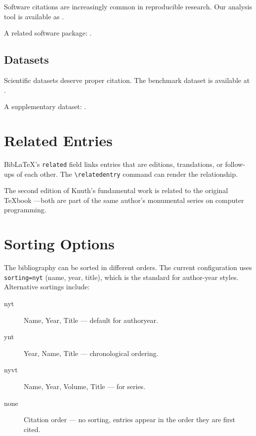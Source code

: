 \documentclass[
    language=english,
    doctype=article,
    institution=none,
]{../../omnilatex}
\begin{document}
Software citations are increasingly common in reproducible research.
Our analysis tool is available as \cite{omnilatex2026}.

A related software package: \cite{biber2024}.

\subsection{Datasets}

Scientific datasets deserve proper citation.  The benchmark dataset is
available at \cite{kaggleGraphBenchmark2025}.

A supplementary dataset: \cite{openalexCitationGraph2025}.

\section{Related Entries}
\label{sec:related}

BibLaTeX's \texttt{related} field links entries that are editions,
translations, or follow-ups of each other.  The \verb|\relatedentry|
command can render the relationship.

The second edition of Knuth's fundamental work
\cite{knuthFundamentalAlgorithms1973} is related to the original TeXbook
\cite{knuthTeXbook1986}---both are part of the same author's
monumental series on computer programming.

\section{Sorting Options}
\label{sec:sorting}

The bibliography can be sorted in different orders.  The current
configuration uses \texttt{sorting=nyt} (name, year, title), which is the
standard for author-year styles.  Alternative sortings include:

\begin{description}
    \item[nyt] Name, Year, Title --- default for authoryear.
    \item[ynt] Year, Name, Title --- chronological ordering.
    \item[nyvt] Name, Year, Volume, Title --- for series.
    \item[none] Citation order --- no sorting, entries appear in the order
        they are first cited.
\end{description}
\end{document}

